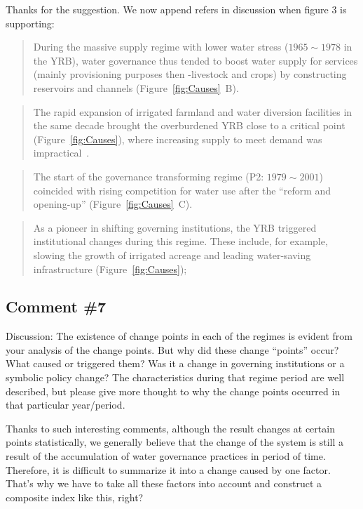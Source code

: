 \AR{} Thanks for the suggestion. We now append refers in discussion when figure 3 is supporting:

\begin{quote}
    During the massive supply regime with lower water stress ($1965 \sim 1978$ in the YRB), water governance thus tended to boost water supply for services (mainly provisioning purposes then -livestock and crops) by constructing reservoirs and channels (Figure~\ref{fig:Causes}~B).
\end{quote}

\begin{quote}
    The rapid expansion of irrigated farmland and water diversion facilities in the same decade brought the overburdened YRB close to a critical point (Figure~\ref{fig:Causes}), where increasing supply to meet demand was impractical~\cite{loch2020}.
\end{quote}

\begin{quote}
    The start of the governance transforming regime (P2: $1979 \sim 2001$) coincided with rising competition for water use after the ``reform and opening-up'' (Figure~\ref{fig:Causes}~C).
\end{quote}

\begin{quote}
    As a pioneer in shifting governing institutions, the YRB triggered institutional changes during this regime. These include, for example, slowing the growth of irrigated acreage and leading water-saving infrastructure (Figure~\ref{fig:Causes});
\end{quote}

\subsection{Comment \#7}
\RC{} Discussion: The existence of change points in each of the regimes is evident from your analysis of the change points. But why did these change ``points'' occur? What caused or triggered them? Was it a change in governing institutions or a symbolic policy change? The characteristics during that regime period are well described, but please give more thought to why the change points occurred in that particular year/period.

\AR{} Thanks to such interesting comments, although the result changes at certain points statistically, we generally believe that the change of the system is still a result of the accumulation of water governance practices in period of time. Therefore, it is difficult to summarize it into a change caused by one factor. That's why we have to take all these factors into account and construct a composite index like this, right?


